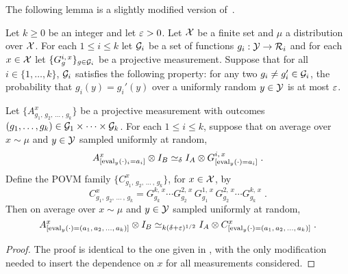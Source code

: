 The following lemma is a slightly modified version of~\cite[Fact~4.34]{NW19}.
\begin{lemma}\label{lem:ld-sandwich}
  Let $k \geq 0$ be an integer and let $\eps>0$.
  Let $\mX$ be a finite set and $\mu$ a distribution over $\mX$.
  For each $1 \leq i \leq k$ let $\mG_i$ be a set of functions $g_i : \mY
  \rightarrow \mR_i$ and for each $x \in \mX$ let $\{G^{i,\, x}_g\}_{g\in
    \mG_i}$ be a projective measurement.
  Suppose that for all $i\in \{1,\ldots,k\}$, $\mG_i$ satisfies the following
  property: for any two $g_i \neq g_i' \in \mG_i$, the probability that $g_i(y)
  = g_i'(y)$ over a uniformly random $y \in \mY$ is at most $\eps$.

  Let $\bigl\{ A^{x}_{g_1,\, g_2,\, \ldots\,,\, g_k} \bigr\}$ be a projective
  measurement with outcomes $(g_1,\ldots,g_k) \in \mG_1\times\cdots\times
  \mG_k$.
  For each $1 \leq i \leq k$, suppose that on average over $x \sim \mu$ and
  $y\in \mY$ sampled uniformly at random,
  \begin{equation}\label{eq:ld-sandwich-1}
    A^{x}_{[\eval_y(\cdot)_i = a_i]} \abc G^{i,\, x}_{[\eval_y(\cdot)=a_i]}\;.
  \end{equation}
  Define the POVM family $\{C^x_{g_1,\, g_2,\, \ldots\,,\, g_k}\}$, for $x\in \mX$, by
  \begin{equation*}
    C^x_{g_1,\, g_2,\, \ldots\,,\, g_k} = G^{k,\, x}_{g_k} \cdots
    G^{2,\, x}_{g_2} \, G^{1,\, x}_{g_1} \, G^{2,\, x}_{g_2} \cdots
    G^{k,\, x}_{g_k}\;.
  \end{equation*}
  Then on average over $x\sim \mu$ and $y\in \mY$ sampled uniformly at random,
  \begin{equation}\label{eq:ld-sandwich-2}
    A^x_{[\eval_y(\cdot) = (a_1,\, a_2,\, \ldots,\, a_k)]} \abc[k(\delta+\eps)^{1/2}]
    C^x_{[\eval_y(\cdot) = (a_1,\, a_2,\, \ldots,\, a_k)]}\;.
\end{equation}
\end{lemma}

\begin{proof}
  The proof is identical to the one given in \cite[Fact~4.34]{NW19}, with the
  only modification needed to insert the dependence on $x$ for all measurements
  considered.
\end{proof}


